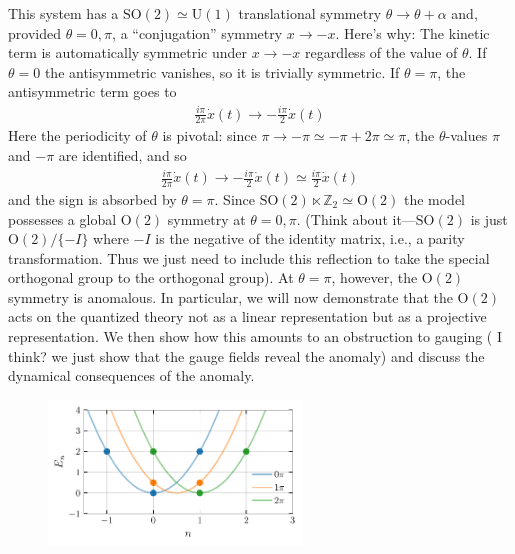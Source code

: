 \documentclass{report}
\begin{document}
This system has a $ \text{SO}(2) \simeq \text{U}(1) $ translational symmetry $
\theta \rightarrow \theta + \alpha $ and, provided $ \theta=0,\pi $, a
``conjugation'' symmetry $ x \rightarrow -x $. Here's why: The kinetic term is
automatically symmetric under $ x \rightarrow -x $ regardless of the value of $
\theta $. If $ \theta=0 $ the antisymmetric vanishes, so it is trivially
symmetric. If $ \theta=\pi $, the antisymmetric term goes to 
\begin{align*}
	\frac{i\pi}{2\pi} \dot{x}(t) 
	\rightarrow -\frac{i\pi}{2}\dot{x}(t)
\end{align*}
Here the periodicity of $ \theta $ is pivotal: since $ \pi \rightarrow -\pi
\simeq -\pi + 2\pi \simeq \pi $, the $ \theta $-values $ \pi $ and $ -\pi $ are
identified, and so 
\begin{align*}
	\frac{i\pi}{2\pi} \dot{x}(t) 
	\rightarrow -\frac{i\pi}{2}\dot{x}(t)\simeq 
	 \frac{i\pi}{2}\dot{x}(t)
\end{align*}
and the sign is absorbed by $ \theta =\pi$. Since $ \text{SO}(2) \ltimes \mathbb{Z}_2 
\simeq \text{O}(2)$ the model possesses a global $ \text{O}(2) $ symmetry at $ \theta=0,\pi $.
(Think about it---$ \text{SO}(2) $ is just $ \text{O}(2)/\{-I\} $ where $ -I $ 
is the negative of the identity matrix, i.e., a parity transformation. Thus 
we just need to include this reflection to take the special orthogonal group 
to the orthogonal group).
At $ \theta=\pi $, however, the $ \text{O}(2) $ symmetry is anomalous. In particular, 
we will now demonstrate that the $ \text{O}(2) $ acts on the quantized theory 
not as a linear representation but as a projective representation. We then 
show how this amounts to an obstruction to gauging ({\color{myred} I think? we just 
show that the gauge fields reveal the anomaly}) and discuss the dynamical 
consequences of the anomaly.

\begin{figure}[t]
	\centering
	\includegraphics[width=0.6\textwidth]{figs/november/spectrum-particle-on-ring.pdf}
	\caption{}
	\label{fig:particle-on-ring-spectrum}
\end{figure}
\end{document}
